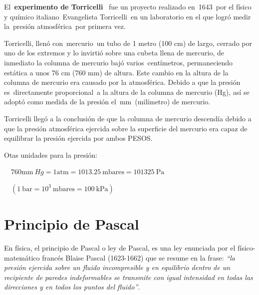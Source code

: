 \begin{miparrafo}
El \textbf{experimento de Torricelli}  fue un proyecto realizado en 1643 por el físico y químico italiano Evangelista Torricelli en un laboratorio en el que logró medir la presión atmosférica por primera vez.

Torricelli, llenó con mercurio un tubo de 1 metro (100 cm) de largo, cerrado por uno de los extremos y lo invirtió sobre una cubeta llena de mercurio, de inmediato la columna de mercurio bajó varios centímetros, permaneciendo estática a unos 76 cm (760 mm) de altura. Este cambio en la altura de la columna de mercurio era causado por la atmosférica. Debido a que la presión es directamente proporcional a la altura de la columna de mercurio (Hg), así se adoptó como medida de la presión el mm (milímetro) de mercurio.

Torricelli llegó a la conclusión de que la columna de mercurio descendía debido a que la presión atmosférica ejercida sobre la superficie del mercurio era capaz de equilibrar la presión ejercida por ambos PESOS.

Otas unidades para la presión:

$\quad 760 \mathrm{mm}\ Hg = 1 \mathrm{atm}=1013.25 \ \mathrm{mbares}=101325 \ \mathrm{Pa}$ 

$\quad (1 \ \mathrm{bar}=10^3 \ \mathrm{mbares}=100 \ \mathrm{kPa})$
\end{miparrafo}

\section{Principio de Pascal}

En física, el principio de Pascal o ley de Pascal, es una ley 
enunciada por el físico-matemático francés Blaise Pascal (1623-1662) 
que se resume en la frase: \emph{``la presión ejercida sobre un fluido 
incompresible y en equilibrio dentro de un recipiente de paredes indeformables se 
transmite con igual intensidad en todas las direcciones y en todos los 
puntos del fluido''}.

